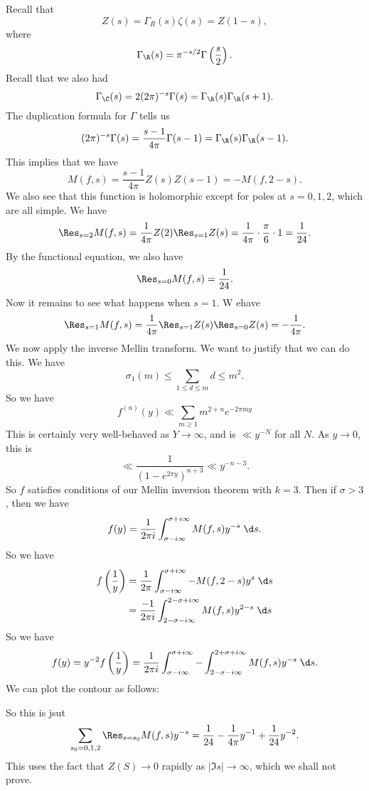 \documentclass[a4paper]{article}
\begin{document}
Recall that
\[
  Z(s) = \Gamma_R(s) \zeta(s) = Z(1 - s),
\]
where
\[
  \Gamma_\R(s) = \pi^{-s/2} \Gamma\left(\frac{s}{2}\right).
\]
Recall that we also had
\[
  \Gamma_\C(s) = 2(2\pi)^{-s} \Gamma(s) = \Gamma_\R(s) \Gamma_\R(s + 1).
\]
The duplication formula for $\Gamma$ tells us
\[
  (2\pi)^{-s} \Gamma(s) = \frac{s - 1}{4\pi} \Gamma(s - 1) = \Gamma_\R(s) \Gamma_\R(s - 1).
\]
This implies that we have
\[
  M(f, s) = \frac{s - 1}{4\pi} Z(s) Z(s - 1) = - M(f, 2 - s).
\]
We also see that this function is holomorphic except for poles at $s = 0, 1, 2$, which are all simple. We have
\[
  \Res_{s = 2} M(f, s) = \frac{1}{4\pi} Z(2) \Res_{s = 1}Z(s) = \frac{1}{4\pi}\cdot \frac{\pi}{6} \cdot 1 = \frac{1}{24}.
\]
By the functional equation, we also have
\[
  \Res_{s = 0} M(f, s) = \frac{1}{24}.
\]
Now it remains to see what happens when $s = 1$. W ehave
\[
  \Res_{s = 1} M(f, s) = \frac{1}{4\pi} \Res_{s = 1} Z(s) \Res_{s = 0}Z(s) = -\frac{1}{4\pi}.
\]
We now apply the inverse Mellin transform. We want to justify that we can do this. We have
\[
  \sigma_1(m) \leq \sum_{1 \leq d \leq m} d \leq m^2.
\]
So we have
\[
  f^{(n)}(y) \ll \sum_{m \geq 1} m^{2 + n} e^{-2\pi m y}
\]
This is certainly very well-behaved as $Y \to \infty$, and is $\ll y^{-N}$ for all $N$. As $y \to 0$, this is
\[
  \ll \frac{1}{(1 - e^{2\pi y})^{n + 3}} \ll y^{-n - 3}.
\]
So $f$ satisfies conditions of our Mellin inversion theorem with $k = 3$. Then if $\sigma > 3$, then we have
\[
  f(y) = \frac{1}{2\pi i} \int_{\sigma - i \infty}^{\sigma + i \infty} M(f, s) y^{-s}\;\d s.
\]
So we have
\begin{align*}
  f\left(\frac{1}{y}\right) &= \frac{1}{2\pi} \int_{\sigma - i \infty}^{\sigma + i \infty} - M(f, 2 - s) y^s \;\d s\\
  &= \frac{-1}{2\pi i} \int_{2 - \sigma - i \infty}^{2 - \sigma + i \infty}M(f, s) y^{2 - s}\;\d s
\end{align*}
So we have
\[
  f(y) = y^{-2} f\left(\frac{1}{y}\right) = \frac{1}{2\pi i} \int_{\sigma - i \infty}^{\sigma + i \infty} - \int_{2 - \sigma - i \infty}^{2 + \sigma + i \infty} M(f, s) y^{-s}\;\d s.
\]
We can plot the contour as follows:
\begin{center}
\end{center}
So this is jsut
\[
  \sum_{s_0 = 0, 1, 2} \Res_{s = s_0} M(f, s) y^{-s} = \frac{1}{24} - \frac{1}{4\pi} y^{-1} + \frac{1}{24} y^{-2}.
\]
This uses the fact that $Z(S) \to 0$ rapidly as $|\Im s| \to \infty$, which we shall not prove.
\end{document}
